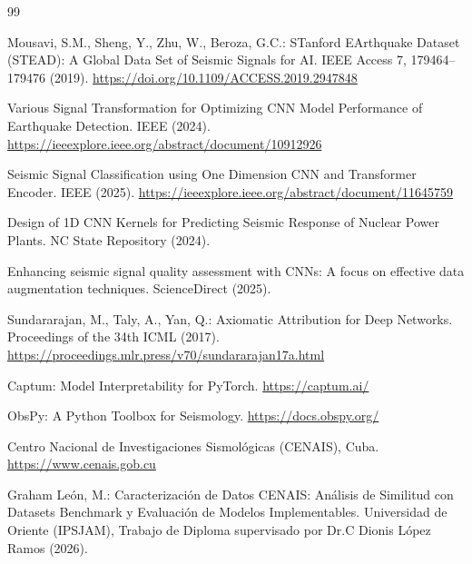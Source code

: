 \documentclass[10pt,a4paper]{article}
\begin{document}
\begin{thebibliography}{99}

Mousavi, S.M., Sheng, Y., Zhu, W., Beroza, G.C.: STanford EArthquake Dataset (STEAD): A Global Data Set of Seismic Signals for AI. IEEE Access 7, 179464--179476 (2019). \url{https://doi.org/10.1109/ACCESS.2019.2947848}

Various Signal Transformation for Optimizing CNN Model Performance of Earthquake Detection. IEEE (2024). \url{https://ieeexplore.ieee.org/abstract/document/10912926}

Seismic Signal Classification using One Dimension CNN and Transformer Encoder. IEEE (2025). \url{https://ieeexplore.ieee.org/abstract/document/11645759}

Design of 1D CNN Kernels for Predicting Seismic Response of Nuclear Power Plants. NC State Repository (2024).

Enhancing seismic signal quality assessment with CNNs: A focus on effective data augmentation techniques. ScienceDirect (2025).

Sundararajan, M., Taly, A., Yan, Q.: Axiomatic Attribution for Deep Networks. Proceedings of the 34th ICML (2017). \url{https://proceedings.mlr.press/v70/sundararajan17a.html}

Captum: Model Interpretability for PyTorch. \url{https://captum.ai/}

ObsPy: A Python Toolbox for Seismology. \url{https://docs.obspy.org/}

Centro Nacional de Investigaciones Sismológicas (CENAIS), Cuba. \url{https://www.cenais.gob.cu}

Graham León, M.: Caracterización de Datos CENAIS: Análisis de Similitud con Datasets Benchmark y Evaluación de Modelos Implementables. Universidad de Oriente (IPSJAM), Trabajo de Diploma supervisado por Dr.C Dionis López Ramos (2026).

\end{thebibliography}
\end{document}
